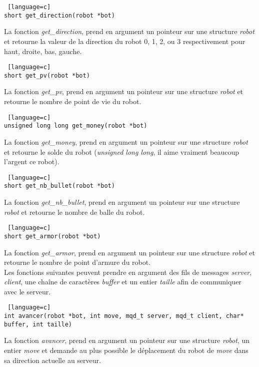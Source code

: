 \documentclass[a4paper, 11pt]{article}
\begin{document}
\begin {lstlisting} [language=c]
short get_direction(robot *bot)
\end{lstlisting}
La fonction \emph{get\_direction}, prend en argument un pointeur sur une structure \emph{robot} et retourne la valeur de la direction du robot 0, 1, 2, ou 3 respectivement pour haut, droite, bas, gauche.\\

\begin {lstlisting} [language=c]
short get_pv(robot *bot)
\end{lstlisting}
La fonction \emph{get\_pv}, prend en argument un pointeur sur une structure \emph{robot} et retourne le nombre de point de vie du robot.\\

\begin {lstlisting} [language=c]
unsigned long long get_money(robot *bot)
\end{lstlisting}
La fonction \emph{get\_money}, prend en argument un pointeur sur une structure \emph{robot} et retourne le solde du robot (\emph{unsigned long long}, il aime vraiment beaucoup l'argent ce robot).\\

\begin {lstlisting} [language=c]
short get_nb_bullet(robot *bot)
\end{lstlisting}
La fonction \emph{get\_nb\_bullet}, prend en argument un pointeur sur une structure \emph{robot} et retourne le nombre de balle du robot.\\

\begin {lstlisting} [language=c]
short get_armor(robot *bot)
\end{lstlisting}
La fonction \emph{get\_armor}, prend en argument un pointeur sur une structure \emph{robot} et retourne le nombre de point d'armure du robot.\\

Les fonctions suivantes peuvent prendre en argument des fils de messages \emph{server}, \emph{client}, une chaîne de caractères \emph{buffer} et un entier \emph{taille} afin de communiquer avec le serveur.\\

\begin {lstlisting} [language=c]
int avancer(robot *bot, int move, mqd_t server, mqd_t client, char* buffer, int taille)
\end{lstlisting}
La fonction \emph{avancer}, prend en argument un pointeur sur une structure \emph{robot}, un entier \emph{move} et demande au plus possible le déplacement du robot de \emph{move} dans sa direction actuelle au serveur.\\
\end{document}
